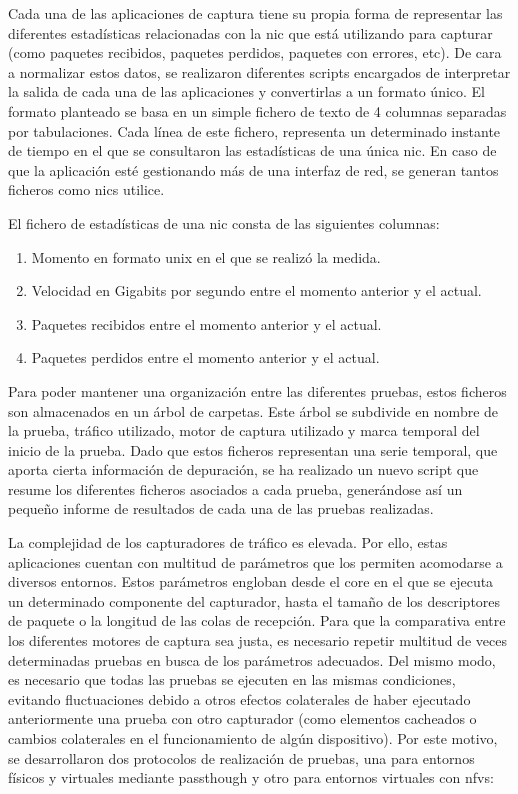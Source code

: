Cada una de las aplicaciones de captura tiene su propia forma de representar las diferentes estadísticas relacionadas con la \gls{nic} que está utilizando para capturar (como paquetes recibidos, paquetes perdidos, paquetes con errores, etc).
De cara a normalizar estos datos, se realizaron diferentes scripts encargados de interpretar la salida de cada una de las aplicaciones y convertirlas a un formato único. El formato planteado se basa en un simple fichero de texto de 4 columnas separadas por tabulaciones. Cada línea de este fichero, representa un determinado instante de tiempo en el que se consultaron las estadísticas de una única \gls{nic}. En caso de que la aplicación esté gestionando más de una interfaz de red, se generan tantos ficheros como \glspl{nic} utilice.

El fichero de estadísticas de una \gls{nic} consta de las siguientes columnas:

\begin{enumerate}
\item Momento en formato unix en el que se realizó la medida.
\item Velocidad en Gigabits por segundo entre el momento anterior y el actual.
\item Paquetes recibidos entre el momento anterior y el actual.
\item Paquetes perdidos entre el momento anterior y el actual.
\end{enumerate}

Para poder mantener una organización entre las diferentes pruebas, estos ficheros son almacenados en un árbol de carpetas. Este árbol se subdivide en nombre de la prueba, tráfico utilizado, motor de captura utilizado y marca temporal del inicio de la prueba.
Dado que estos ficheros representan una serie temporal, que aporta cierta información de depuración, se ha realizado un nuevo script que resume los diferentes ficheros asociados a cada prueba, generándose así un pequeño informe de resultados de cada una de las pruebas realizadas.

La complejidad de los capturadores de tráfico es elevada. Por ello, estas aplicaciones cuentan con multitud de parámetros que los permiten acomodarse a diversos entornos. Estos parámetros engloban desde el \gls{core} en el que se ejecuta un determinado componente del capturador, hasta el tamaño de los descriptores de paquete o la longitud de las colas de recepción.
%
Para que la comparativa entre los diferentes motores de captura sea justa, es necesario repetir multitud de veces determinadas pruebas en busca de los parámetros adecuados. Del mismo modo, es necesario que todas las pruebas se ejecuten en las mismas condiciones, evitando fluctuaciones debido a otros efectos colaterales de haber ejecutado anteriormente una prueba con otro capturador (como elementos cacheados o cambios colaterales en el funcionamiento de algún dispositivo). Por este motivo, se desarrollaron dos protocolos de realización de pruebas, una para entornos físicos y virtuales mediante \gls{passthough} y otro para entornos virtuales con \glspl{nfv}:

